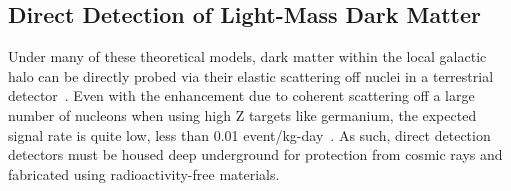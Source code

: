 

\subsection{Direct Detection of Light-Mass Dark Matter}

Under many of these theoretical models, dark matter within the local galactic halo can be directly probed via their elastic scattering off nuclei in a terrestrial detector~\cite{Goodman:1984dc, Gaitskell:2004gd}. Even with the enhancement due to %
coherent scattering off a large number of nucleons when using high Z targets like germanium, the expected signal rate is quite low, less than 0.01 event/kg-day~\cite{Bertone:2004pz, Lewin:1995rx}. As such, direct detection detectors must be housed deep underground for protection from cosmic rays and fabricated using radioactivity-free materials.

